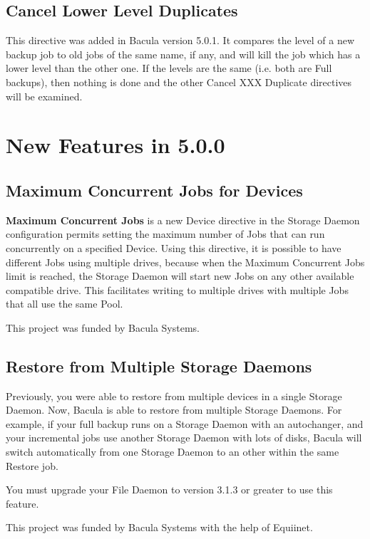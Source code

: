 \subsection{Cancel Lower Level Duplicates}
This directive was added in Bacula version 5.0.1.  It compares the
level of a new backup job to old jobs of the same name, if any,
and will kill the job which has a lower level than the other one.
If the levels are the same (i.e. both are Full backups), then 
nothing is done and the other Cancel XXX Duplicate directives
will be examined.

\section{New Features in 5.0.0}

\subsection{Maximum Concurrent Jobs for Devices}
\label{sec:maximumconcurrentjobdevice}

{\bf Maximum Concurrent Jobs} is a new Device directive in the Storage
Daemon configuration permits setting the maximum number of Jobs that can
run concurrently on a specified Device.  Using this directive, it is
possible to have different Jobs using multiple drives, because when the
Maximum Concurrent Jobs limit is reached, the Storage Daemon will start new
Jobs on any other available compatible drive.  This facilitates writing to
multiple drives with multiple Jobs that all use the same Pool.

This project was funded by Bacula Systems.

\subsection{Restore from Multiple Storage Daemons}

Previously, you were able to restore from multiple devices in a single Storage
Daemon. Now, Bacula is able to restore from multiple Storage Daemons. For
example, if your full backup runs on a Storage Daemon with an autochanger, and
your incremental jobs use another Storage Daemon with lots of disks, Bacula
will switch automatically from one Storage Daemon to an other within the same
Restore job.

You must upgrade your File Daemon to version 3.1.3 or greater to use this
feature.

This project was funded by Bacula Systems with the help of Equiinet.

